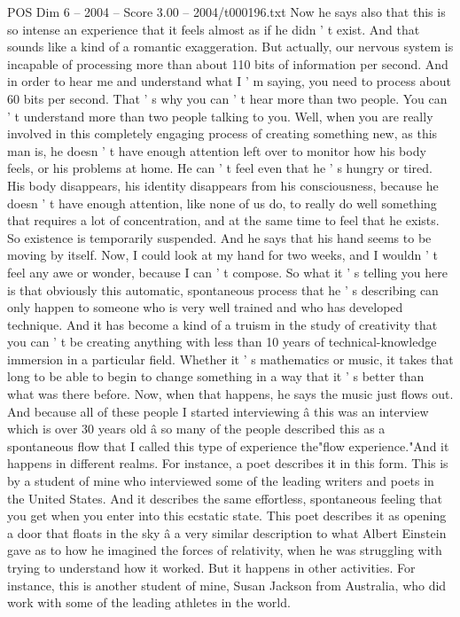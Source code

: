 \begin{textsample}{POS Dim 6 – 2004 – Score 3.00 – 2004/t000196.txt}
Now he says also that this is so intense an experience that it feels almost as if he didn ' t exist.
And that sounds like a kind of a romantic exaggeration.
But actually, our nervous system is incapable of processing more than about 110 bits of information per second.
And in order to hear me and understand what I ' m saying, you need to process about 60 bits per second.
That ' s why you can ' t hear more than two people.
You can ' t understand more than two people talking to you.
Well, when you are really involved in this completely engaging process of creating something new, as this man is, he doesn ' t have enough attention left over to monitor how his body feels, or his problems at home.
He can ' t feel even that he ' s hungry or tired.
His body disappears, his identity disappears from his consciousness, because he doesn ' t have enough attention, like none of us do, to really do well something that requires a lot of concentration, and at the same time to feel that he exists.
So existence is temporarily suspended.
And he says that his hand seems to be moving by itself.
Now, I could look at my hand for two weeks, and I wouldn ' t feel any awe or wonder, because I can ' t compose.
So what it ' s telling you here is that obviously this automatic, spontaneous process that he ' s describing can only happen to someone who is very well trained and who has developed technique.
And it has become a kind of a truism in the study of creativity that you can ' t be creating anything with less than 10 years of technical-knowledge immersion in a particular field.
Whether it ' s mathematics or music, it takes that long to be able to begin to change something in a way that it ' s better than what was there before.
Now, when that happens, he says the music just flows out.
And because all of these people I started interviewing â this was an interview which is over 30 years old â so many of the people described this as a spontaneous flow that I called this type of experience the"flow experience."And it happens in different realms.
For instance, a poet describes it in this form.
This is by a student of mine who interviewed some of the leading writers and poets in the United States.
And it describes the same effortless, spontaneous feeling that you get when you enter into this ecstatic state.
This poet describes it as opening a door that floats in the sky â a very similar description to what Albert Einstein gave as to how he imagined the forces of relativity, when he was struggling with trying to understand how it worked.
But it happens in other activities.
For instance, this is another student of mine, Susan Jackson from Australia, who did work with some of the leading athletes in the world.

\end{textsample}
